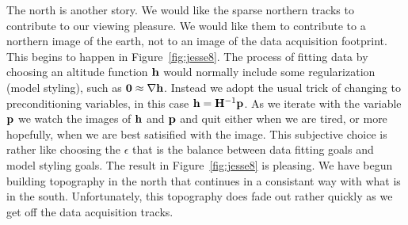 
\par
The north is another story.
We would like the sparse northern tracks
to contribute to our viewing pleasure.
We would like them to contribute to a northern image of the earth,
not to an image of the data acquisition footprint.
This begins to happen in Figure~\ref{fig:jesse8}.
The process of fitting data by choosing an altitude function $\bold h$
would normally include some regularization (model styling),
such as
$\bold 0\approx \nabla \bold h$.
Instead we adopt the usual trick
of changing to preconditioning variables,
in this case $\bold h = \bold H^{-1}\bold p$.
As we iterate with the variable $\bold p$ we watch the images
of $\bold h$ and $\bold p$ and quit either when we are tired,
or more hopefully, when we are best satisified with the image.
This subjective choice is rather like choosing the $\epsilon$
that is the balance between data fitting goals and model styling goals.
The result
in Figure~\ref{fig:jesse8}
is pleasing.
We have begun building topography in the north that continues
in a consistant way with what is in the south.
Unfortunately, this topography does fade out rather quickly
as we get off the data acquisition tracks.



